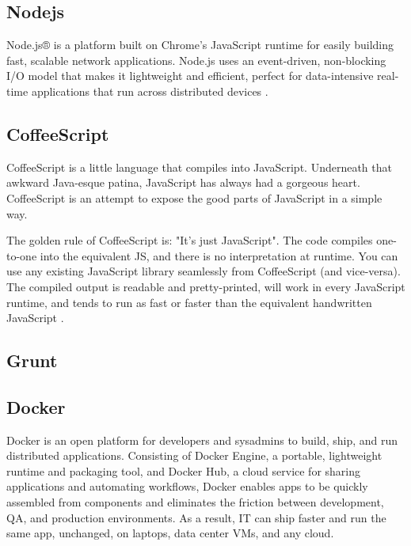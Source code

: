 	\subsection{Nodejs}
	Node.js® is a platform built on Chrome's JavaScript runtime for easily building fast, scalable network applications. Node.js uses an event-driven, non-blocking I/O model that makes it lightweight and efficient, perfect for data-intensive real-time applications that run across distributed devices \cite{technology_nodejs}.
	
	\subsection{CoffeeScript}
	CoffeeScript is a little language that compiles into JavaScript. Underneath that awkward Java-esque patina, JavaScript has always had a gorgeous heart. CoffeeScript is an attempt to expose the good parts of JavaScript in a simple way.
	
	The golden rule of CoffeeScript is: "It's just JavaScript". The code compiles one-to-one into the equivalent JS, and there is no interpretation at runtime. You can use any existing JavaScript library seamlessly from CoffeeScript (and vice-versa). The compiled output is readable and pretty-printed, will work in every JavaScript runtime, and tends to run as fast or faster than the equivalent handwritten JavaScript \cite{technology_coffeescript}.
	
	\subsection{Grunt} 
	\cite{technology_gruntjs}
	
	\subsection{Docker}
	Docker is an open platform for developers and sysadmins to build, ship, and run distributed applications. Consisting of Docker Engine, a portable, lightweight runtime and packaging tool, and Docker Hub, a cloud service for sharing applications and automating workflows, Docker enables apps to be quickly assembled from components and eliminates the friction between development, QA, and production environments. As a result, IT can ship faster and run the same app, unchanged, on laptops, data center VMs, and any cloud\cite{technology_docker}.
	
	




